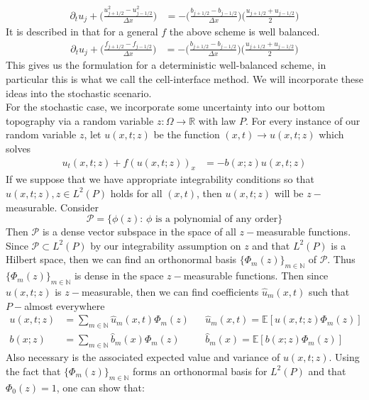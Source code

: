 \documentclass[12pt]{article}
\begin{document}
\begin{align}
    \partial_t u_j + \Big(\frac{u_{j+1/2}^2-u_{j-1/2}^2}{\Delta x}\Big) &= -\Big(\frac{b_{j+1/2}-b_{j-1/2}}{\Delta x}\Big)\Big(\frac{u_{j+1/2}+u_{j-1/2}}{2}\Big)\label{semidiscrete_burgers}
\end{align}
It is described in \cite{Jin2001} that for a general $f$ the above scheme is well balanced. 
\begin{align}
    \partial_t u_j + \Big(\frac{f_{j+1/2}-f_{j-1/2}}{\Delta x}\Big) &= -\Big(\frac{b_{j+1/2}-b_{j-1/2}}{\Delta x}\Big)\Big(\frac{u_{j+1/2}+u_{j-1/2}}{2}\Big) \label{deterministic_wb}
\end{align}
This gives us the formulation for a deterministic well-balanced scheme, in particular this is what we call the cell-interface method. We will incorporate these ideas into the stochastic scenario.
\\ \newline
For the stochastic case, we incorporate some uncertainty into our bottom topography via a random variable $z:\Omega\to\mathbb{R}$ with law $P$. For every instance of our random variable $z$, let $u(x,t;z)$ be the function $(x,t)\to u(x,t;z)$ which solves
\begin{align}  \label{Stochastic_PDE}
    u_t(x,t;z) + f(u(x,t;z))_x &= - b(x;z)u(x,t;z)
\end{align}
If we suppose that we have appropriate integrability conditions so that $u(x,t;z),z\in L^2(P)$ holds for all $(x,t)$, then $u(x,t;z)$ will be $z-$measurable. Consider $$\mathcal{P} = \{\phi(z):\,\phi\,\,\text{is a polynomial of any order}\}$$ 
Then $\mathcal{P}$ is a dense vector subspace in the space of all $z-$measurable functions. Since $\mathcal{P}\subset L^2(P)$ by our integrability assumption on $z$ and that $L^2(P)$ is a Hilbert space, then we can find an orthonormal basis $\{\Phi_m(z)\}_{m\in\mathbb{N}}$ of $\mathcal{P}$. Thus $\{\Phi_m(z)\}_{m\in\mathbb{N}}$ is dense in the space $z-$measurable functions. Then since $u(x,t;z)$ is $z-$measurable, then we can find coefficients $\hat{u}_m(x,t)$ such that $P-$almost everywhere
\begin{align}
    u(x,t;z) &= \sum_{m\in\mathbb{N}}\hat{u}_m(x,t)\Phi_m(z)&&\hat{u}_m(x,t) = \mathbb{E}[u(x,t;z)\Phi_m(z)]\nonumber\\
    b(x;z) &= \sum_{m\in\mathbb{N}}\hat{b}_m(x)\Phi_m(z)&&\hat{b}_m(x) = \mathbb{E}[b(x;z)\Phi_m(z)]\nonumber
\end{align}
Also necessary is the associated expected value and variance of $u(x,t;z)$. Using the fact that $\{\Phi_m(z)\}_{m \in \mathbb{N}}$ forms an orthonormal basis for $L^2(P)$ and that $\Phi_0(z) = 1$, one can show \cite[Chapter~5.3]{Xiu2010} that:
\end{document}
